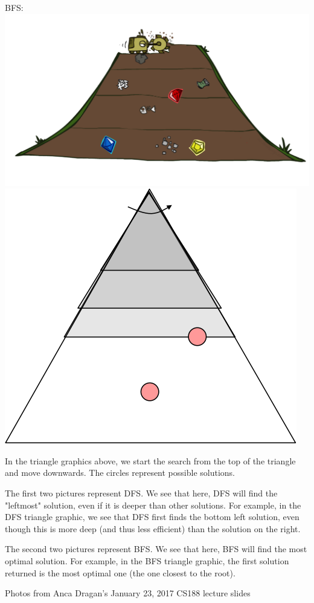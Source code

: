 \begin{blocksection}
\begin{solution}[0.25in]
BFS:
\includegraphics[scale=0.30]{bfs.png}
\includegraphics[scale=0.5]{bfs-triangle.png}

In the triangle graphics above, we start the search from the top of the triangle and move downwards.  The circles represent possible solutions.

The first two pictures represent DFS.  We see that here, DFS will find the "leftmost" solution, even if it is deeper than other solutions.  For example, in the DFS triangle graphic, we see that DFS first finds the bottom left solution, even though this is more deep (and thus less efficient) than the solution on the right. 

The second two pictures represent BFS.  We see that here, BFS will find the most optimal solution.  For example, in the BFS triangle graphic, the first solution returned is the most optimal one (the one closest to the root).

Photos from Anca Dragan's January 23, 2017 CS188 lecture slides
\end{solution}
\end{blocksection}
